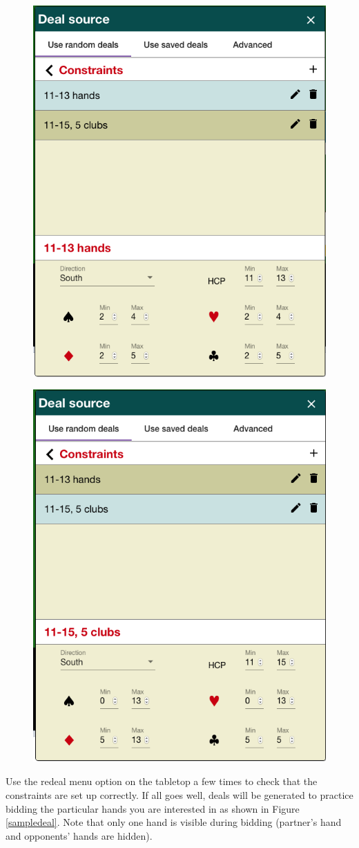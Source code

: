 \documentclass[a4paper,article,oneside]{memoir}
\begin{document}
\begin{figure}[htbp]
  \centering
  \begin{minipage}{.5\textwidth}
    \centering
    \includegraphics[width=.5\linewidth]{11-13-constraints.png}
    \label{balanced}
  \end{minipage}%
  \begin{minipage}{.5\textwidth}
    \centering
    \includegraphics[width=.5\linewidth]{5-clubs-constraints.png}
    \label{twosuiter}
  \end{minipage}
\end{figure}

Use the redeal menu option on the tabletop a few times to check that
the constraints are set up correctly. If all goes well, deals will be
generated to practice bidding the particular hands you are interested
in as shown in Figure \ref{sampledeal}.  Note that only one hand is
visible during bidding (partner's hand and opponents' hands are
hidden).
 
\end{document}
